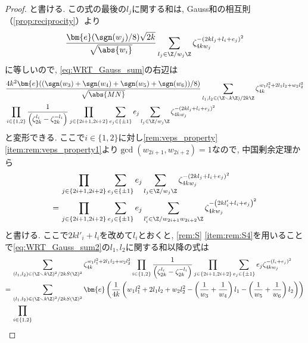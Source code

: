 \documentclass[11pt,b5paper,oneside,lualatex]{ltjsarticle} %
\numberwithin{equation}{section} %
\begin{document}
\begin{proof}
	と書ける. 
	この式の最後の$ l_j $に関する和は, Gauss和の相互則（\cref{prop:reciprocity}）より
	\[	
	\frac{\bm{e}(\sgn(w_j)/8) \sqrt{2k}}{\sqrt{\abs{w_i}}}
	\sum_{l_j \in \Z/ w_j \Z}
	\zeta_{4k w_j}^{ -\left( 2k l_j + l_i + e_j \right)^2 }
	\]
	に等しいので, \cref{eq:WRT_Gauss_sum}の右辺は
	\begin{equation} \label{eq:WRT_Gauss_sum2}
		\begin{aligned}
			&\frac{4k^2 \bm{e}((\sgn(w_3) + \sgn(w_4) +\sgn(w_5) + \sgn(w_6))/8)}{\sqrt{\abs{MN}}}
			\sum_{l_1, l_2 \in (\Z \smallsetminus k\Z) / 2k\Z}
			\zeta_{4k}^{w_1 l_1^2 + 2 l_1 l_2 + w_2 l_2^2}
			\\
			&\prod_{i \in \{ 1, 2\}}
			\frac{1}{\left( \zeta_{2k}^{l_i} - \zeta_{2k}^{-l_i} \right)}
			\prod_{j \in \{ 2i+1, 2i+2 \}} \sum_{e_j \in \{ \pm 1 \} } e_j
			\sum_{l_j \in \Z/ w_j \Z}
			\zeta_{4k w_j}^{ -\left( 2k l_j + l_i + e_j \right)^2 }
		\end{aligned}
	\end{equation}	
	と変形できる. 
	ここで$ i \in \{ 1, 2 \} $に対し\cref{rem:veps_property} \cref{item:rem:veps_property1}より$ \gcd(w_{2i+1}, w_{2i+2}) = 1 $なので, 中国剰余定理から
	\begin{align}
		&\prod_{j \in \{ 2i+1, 2i+2 \}} \sum_{e_j \in \{ \pm 1 \} } e_j
		\sum_{l_j \in \Z/ w_j \Z}
		\zeta_{4k w_j}^{ -\left( 2k l_j + l_i + e_j \right)^2 } \\
		= \,
		&\prod_{j \in \{ 2i+1, 2i+2 \}} \sum_{e_j \in \{ \pm 1 \} } e_j
		\sum_{l'_i \in \Z/ w_{2i+1} w_{2i+2} \Z}
		\zeta_{4k w_j}^{ -\left( 2k l'_i + l_i + e_j \right)^2 }		
	\end{align}
	と書ける. 
	ここで$ 2k l'_i + l_i $を改めて$ l_i $とおくと, \cref{rem:S} \cref{item:rem:S4}を用いることで\cref{eq:WRT_Gauss_sum2}の$ l_1, l_2 $に関する和以降の式は
	\begin{align}
		&\sum_{(l_1, l_2) \in (\Z \smallsetminus k\Z)^2 / 2k S(\Z)^2}
		\zeta_{4k}^{w_1 l_1^2 + 2 l_1 l_2 + w_2 l_2^2}
		\prod_{i \in \{ 1, 2\}}
		\frac{1}{\left( \zeta_{2k}^{l_i} - \zeta_{2k}^{-l_i} \right)}
		\prod_{j \in \{ 2i+1, 2i+2 \}} \sum_{e_j \in \{ \pm 1 \} } e_j
		\zeta_{4k w_j}^{ -\left( l_i + e_j \right)^2 }\\
		= \,
		&\sum_{(l_1, l_2) \in (\Z \smallsetminus k\Z)^2 / 2k S(\Z)^2}
		\bm{e} \left( 
		\frac{1}{4k} \left( 
		w_1 l_1^2 + 2 l_1 l_2 + w_2 l_2^2
		- \left( \frac{1}{w_3} + \frac{1}{w_4} \right) l_1
		- \left( \frac{1}{w_5} + \frac{1}{w_6} \right) l_2
		\right) \right)
		\\
		&\prod_{i \in \{ 1, 2\}}

\end{align}
\end{proof}
\end{document}
